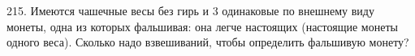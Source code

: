 215. Имеются чашечные весы без гирь и 3 одинаковые по внешнему виду монеты, одна из которых фальшивая: она легче настоящих (настоящие монеты одного веса). Сколько надо взвешиваний, чтобы определить фальшивую монету?\\
